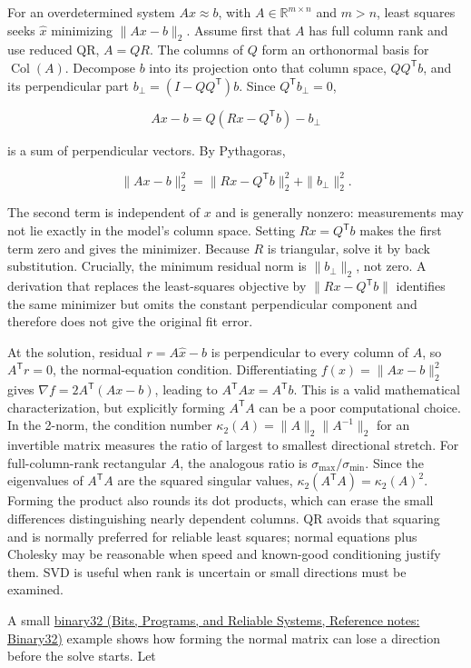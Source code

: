 For an overdetermined system \(Ax\approx b\), with \(A\in\mathbb R^{m\times n}\) and \(m>n\), least squares seeks \(\hat x\) minimizing \(\|Ax-b\|_2\). Assume first that \(A\) has full column rank and use reduced QR, \(A=QR\). The columns of \(Q\) form an orthonormal basis for \(\operatorname{Col}(A)\). Decompose \(b\) into its projection onto that column space, \(QQ^\mathsf Tb\), and its perpendicular part \(b_\perp=(I-QQ^\mathsf T)b\). Since \(Q^\mathsf Tb_\perp=0\),

\[
Ax-b=Q(Rx-Q^\mathsf Tb)-b_\perp
\]

is a sum of perpendicular vectors. By Pythagoras,

\[
\|Ax-b\|_2^2=\|Rx-Q^\mathsf Tb\|_2^2+\|b_\perp\|_2^2.
\]

The second term is independent of \(x\) and is generally nonzero: measurements may not lie exactly in the model's column space. Setting \(Rx=Q^\mathsf Tb\) makes the first term zero and gives the minimizer. Because \(R\) is triangular, solve it by back substitution. Crucially, the minimum residual norm is \(\|b_\perp\|_2\), not zero. A derivation that replaces the least-squares objective by \(\|Rx-Q^\mathsf Tb\|\) identifies the same minimizer but omits the constant perpendicular component and therefore does not give the original fit error.

At the solution, residual \(r=A\hat x-b\) is perpendicular to every column of \(A\), so \(A^\mathsf Tr=0\), the normal-equation condition. Differentiating \(f(x)=\|Ax-b\|_2^2\) gives \(\nabla f=2A^\mathsf T(Ax-b)\), leading to \(A^\mathsf TAx=A^\mathsf Tb\). This is a valid mathematical characterization, but explicitly forming \(A^\mathsf TA\) can be a poor computational choice. In the 2-norm, the condition number \(\kappa_2(A)=\|A\|_2\|A^{-1}\|_2\) for an invertible matrix measures the ratio of largest to smallest directional stretch. For full-column-rank rectangular \(A\), the analogous ratio is \(\sigma_{\max}/\sigma_{\min}\). Since the eigenvalues of \(A^\mathsf TA\) are the squared singular values, \(\kappa_2(A^\mathsf TA)=\kappa_2(A)^2\). Forming the product also rounds its dot products, which can erase the small differences distinguishing nearly dependent columns. QR avoids that squaring and is normally preferred for reliable least squares; normal equations plus Cholesky may be reasonable when speed and known-good conditioning justify them. SVD is useful when rank is uncertain or small directions must be examined.

A small \href{../01-Bits-Programs-and-Reliable-Systems/main.pdf\#nameddest=appendix-5057f9ad327f}{binary32 (Bits, Programs, and Reliable Systems, Reference notes: Binary32)} example shows how forming the normal matrix can lose a direction before the solve starts. Let

